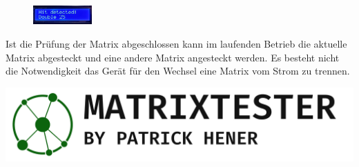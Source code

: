 \documentclass[12pt,landscape,letterpaper]{article}
\begin{document}
\begin{multicols}{3}
\begin{figure}[H]
    \centering
    \includegraphics[width=0.2\textwidth]{media/detection-2.jpg}
\end{figure}

Ist die Prüfung der Matrix abgeschlossen kann im laufenden Betrieb die aktuelle Matrix abgesteckt und eine andere Matrix angesteckt werden. Es besteht nicht die Notwendigkeit das Gerät für den Wechsel eine Matrix vom Strom zu trennen.

\vfill
{\hfill\includegraphics[width=0.9\hsize]{media/Banner.png}\hfill}

\end{multicols}
\end{document}
